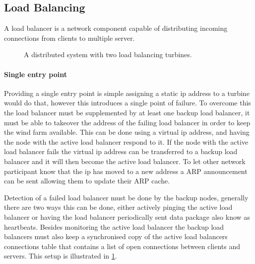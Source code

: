 \FloatBarrier
\subsection{Load Balancing}
A load balancer is a network component capable of distributing incoming connections from clients to multiple server.

\begin{figure}
	\centering	
	\scalebox{0.7}{}
	\caption[Distributed system with two load balancing turbines]{
		\label{fig:loadBalancingSetup2Balancers} 
		\footnotesize{%
			A distributed system with two load balancing turbines.
		}
	}
\end{figure}


\paragraph{Single entry point}
Providing a single entry point is simple assigning a static ip address to a turbine would do that, however this introduces a single point of failure.
To overcome this the load balancer must be supplemented by at least one backup load balancer, it must be able to takeover the address of the failing load balancer in order to keep the wind farm available.
This can be done using a virtual ip address, and having the node with the active load balancer respond to it.
If the node with the active load balancer fails the virtual ip address can be transferred to a backup load balancer and it will then become the active load balancer. To let other network participant know that the ip has moved to a new address a ARP announcement can be sent allowing them to update their ARP cache.

Detection of a failed load balancer must be done by the backup nodes, generally there are two ways this can be done, either actively pinging the active load balancer or having the load balancer periodically sent data package also know as heartbeats.
Besides monitoring the active load balancer the backup load balancers must also keep a synchronised copy of the active load balancers connections table that contains a list of open connections between clients and servers.
This setup is illustrated in \cref{fig:loadBalancingSetup2Balancers}.



